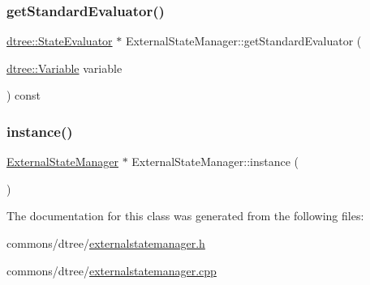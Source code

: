 \subsubsection{\texorpdfstring{getStandardEvaluator()}{getStandardEvaluator()}}
{\footnotesize\ttfamily \mbox{\hyperlink{classdtree_1_1_state_evaluator}{dtree\+::\+State\+Evaluator}} $\ast$ External\+State\+Manager\+::get\+Standard\+Evaluator (\begin{DoxyParamCaption}\item[{\mbox{\hyperlink{namespacedtree_a79fe30831a14df904319f9e783b3189b}{dtree\+::\+Variable}}}]{variable }\end{DoxyParamCaption}) const}

\mbox{\label{class_external_state_manager_a6d689daf90a0bc8b83c3f0db10877251}} 
\subsubsection{\texorpdfstring{instance()}{instance()}}
{\footnotesize\ttfamily \mbox{\hyperlink{class_external_state_manager}{External\+State\+Manager}} $\ast$ External\+State\+Manager\+::instance (\begin{DoxyParamCaption}{ }\end{DoxyParamCaption})\hspace{0.3cm}{\ttfamily [static]}}



The documentation for this class was generated from the following files\+:\begin{DoxyCompactItemize}
\item 
commons/dtree/\mbox{\hyperlink{externalstatemanager_8h}{externalstatemanager.\+h}}\item 
commons/dtree/\mbox{\hyperlink{externalstatemanager_8cpp}{externalstatemanager.\+cpp}}\end{DoxyCompactItemize}
